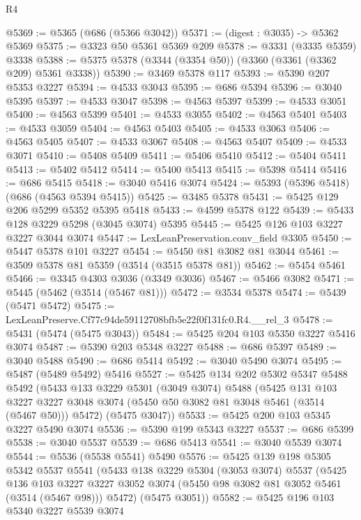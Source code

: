 \begin{lexlean}{R4}
\begin{coremodule}
@5369 := @5365 (@686 (@5366 @3042))
@5371 := (digest : @3035) -> @5362 @5369
@5375 := @3323 @50 @5361 @5369 @209
@5378 := @3331 (@3335 @5359) @3338
@5388 := @5375 @5378 (@3344 (@3354 @50)) (@3360 (@3361 (@3362 @209) @5361 @3338))
@5390 := @3469 @5378 @117
@5393 := @5390 @207 @5353 @3227
@5394 := @4533 @3043
@5395 := @686 @5394
@5396 := @3040 @5395
@5397 := @4533 @3047
@5398 := @4563 @5397
@5399 := @4533 @3051
@5400 := @4563 @5399
@5401 := @4533 @3055
@5402 := @4563 @5401
@5403 := @4533 @3059
@5404 := @4563 @5403
@5405 := @4533 @3063
@5406 := @4563 @5405
@5407 := @4533 @3067
@5408 := @4563 @5407
@5409 := @4533 @3071
@5410 := @5408 @5409
@5411 := @5406 @5410
@5412 := @5404 @5411
@5413 := @5402 @5412
@5414 := @5400 @5413
@5415 := @5398 @5414
@5416 := @686 @5415
@5418 := @3040 @5416 @3074
@5424 := @5393 (@5396 @5418) (@686 (@4563 @5394 @5415))
@5425 := @3485 @5378
@5431 := @5425 @129 @206 @5299 @5352 @5395 @5418
@5433 := @4599 @5378 @122
@5439 := @5433 @128 @3229 @5298 (@3045 @3074) @5395
@5445 := @5425 @126 @103 @3227 @3227 @3044 @3074
@5447 := LexLeanPreservation.conv_field @3305
@5450 := @5447 @5378 @101 @3227
@5454 := @5450 @81 @3082 @81 @3044
@5461 := @3509 @5378 @81 @5359 (@3514 (@3515 @5378 @81))
@5462 := @5454 @5461
@5466 := @3345 @4303 @3036 (@3349 @3036)
@5467 := @5466 @3082
@5471 := @5445 (@5462 (@3514 (@5467 @81)))
@5472 := @3534 @5378
@5474 := @5439 (@5471 @5472)
@5475 := LexLeanPreserve.Cf77c94de59112708bfb5e22f0f131fc0.R4.__rel_3
@5478 := @5431 (@5474 (@5475 @3043))
@5484 := @5425 @204 @103 @5350 @3227 @5416 @3074
@5487 := @5390 @203 @5348 @3227
@5488 := @686 @5397
@5489 := @3040 @5488
@5490 := @686 @5414
@5492 := @3040 @5490 @3074
@5495 := @5487 (@5489 @5492) @5416
@5527 := @5425
    @134
    @202
    @5302
    @5347
    @5488
    @5492
    (@5433
      @133
      @3229
      @5301
      (@3049 @3074)
      @5488
      (@5425
        @131
        @103
        @3227
        @3227
        @3048
        @3074
        (@5450 @50 @3082 @81 @3048 @5461 (@3514 (@5467 @50)))
        @5472)
      (@5475 @3047))
@5533 := @5425 @200 @103 @5345 @3227 @5490 @3074
@5536 := @5390 @199 @5343 @3227
@5537 := @686 @5399
@5538 := @3040 @5537
@5539 := @686 @5413
@5541 := @3040 @5539 @3074
@5544 := @5536 (@5538 @5541) @5490
@5576 := @5425
    @139
    @198
    @5305
    @5342
    @5537
    @5541
    (@5433
      @138
      @3229
      @5304
      (@3053 @3074)
      @5537
      (@5425
        @136
        @103
        @3227
        @3227
        @3052
        @3074
        (@5450 @98 @3082 @81 @3052 @5461 (@3514 (@5467 @98)))
        @5472)
      (@5475 @3051))
@5582 := @5425 @196 @103 @5340 @3227 @5539 @3074

\end{coremodule}
\end{lexlean}
